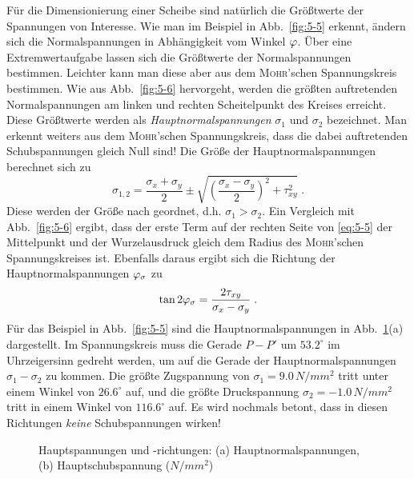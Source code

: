 Für die Dimensionierung einer Scheibe sind natürlich die Größtwerte der Spannungen von Interesse.
Wie man im Beispiel in Abb.~\ref{fig:5-5} erkennt, ändern sich die Normalspannungen in Abhängigkeit vom Winkel $\varphi$.
Über eine Extremwertaufgabe lassen sich die Größtwerte der Normalspannungen bestimmen.
Leichter kann man diese aber aus dem \textsc{Mohr}'schen Spannungskreis bestimmen.
Wie aus Abb.~\ref{fig:5-6} hervorgeht, werden die größten auftretenden Normalspannungen am linken und rechten Scheitelpunkt des Kreises erreicht.
Diese Größtwerte werden als \emph{Hauptnormalspannungen} $\sigma_1$ und $\sigma_2$ bezeichnet.
Man erkennt weiters aus dem \textsc{Mohr}'schen Spannungskreis, dass die dabei auftretenden Schubspannungen gleich Null sind!
Die Größe der Hauptnormalspannungen berechnet sich zu
%
\begin{equation}
\sigma_{1,2}=\dfrac{\sigma_x+\sigma_y}{2}\pm\sqrt{\left(\dfrac{\sigma_x-\sigma_y}{2}\right)^2+\tau_{xy}^2} \; .
\label{eq:5-5}
\end{equation}
%
Diese werden der Größe nach geordnet, d.h. $\sigma_1>\sigma_2$.
Ein Vergleich mit Abb.~\ref{fig:5-6} ergibt, dass der erste Term auf der rechten Seite von \eqref{eq:5-5} der Mittelpunkt und der Wurzelausdruck gleich dem Radius des \textsc{Mohr}'schen Spannungskreises ist.
Ebenfalls daraus ergibt sich die Richtung der Hauptnormalspannungen $\varphi_\sigma$ zu
%
\begin{equation}
\tan 2\varphi_\sigma=\dfrac{2\tau_{xy}}{\sigma_x-\sigma_y} \; .
\label{eq:5-6}
\end{equation}
%
Für das Beispiel in Abb.~\ref{fig:5-5} sind die Hauptnormalspannungen in Abb.~\ref{fig:5-8}(a) dargestellt.
Im Spannungskreis muss die Gerade $P-P'$ um $53.2^\circ$ im Uhrzeigersinn gedreht werden, um auf die Gerade der Hauptnormalspannungen $\sigma_1-\sigma_2$ zu kommen.
Die größte Zugspannung von $\sigma_1=9.0\,\unit{N/mm^2}$ tritt unter einem Winkel von $26.6^\circ$ auf, und die größte Druckspannung $\sigma_2=-1.0\,\unit{N/mm^2}$ tritt in einem Winkel von $116.6^\circ$ auf.
Es wird nochmals betont, dass in diesen Richtungen \emph{keine} Schubspannungen wirken!
%
\begin{figure}[h!]
	\centering
	
	\caption{Hauptspannungen und -richtungen: (a) Hauptnormalspannungen, (b) Hauptschubspannung ($\unit{N/mm^2}$)}
	\label{fig:5-8}
\end{figure}
%

